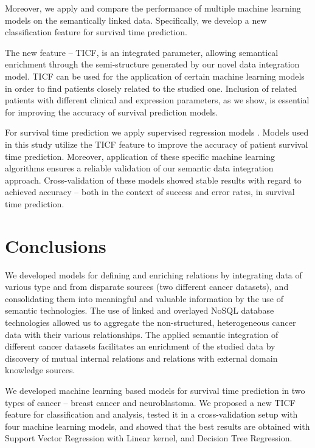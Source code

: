\documentclass{bmcart}
\begin{document}
Moreover, we apply and compare the performance of multiple machine
learning models on the semantically linked data. Specifically, we
develop a new classification feature for survival time prediction. 

The new feature -- TICF, is an integrated parameter, allowing semantical
enrichment through the semi-structure generated by our novel data
integration model. TICF can be used for the application of certain
machine learning models in order to find patients closely related to
the studied one. Inclusion of related patients with different clinical
and expression parameters, as we show, is essential for improving the
accuracy of survival prediction models.

For survival time prediction we apply supervised regression models \cite{19,20}. Models used in this study utilize the TICF feature to improve the
accuracy of patient survival time prediction. Moreover, application of
these specific machine learning algorithms ensures a reliable
validation of our semantic data integration approach. Cross-validation
of these models showed stable results with regard to achieved accuracy
-- both in the context of success and error rates, in survival time
prediction.  

\section{Conclusions}

We developed models for defining and enriching relations by integrating
data of various type and from disparate sources (two different cancer
datasets), and consolidating them into meaningful and valuable
information by the use of semantic technologies. The use of linked and
overlayed NoSQL database technologies allowed us to aggregate the
non-structured, heterogeneous cancer data with their various
relationships. The applied semantic integration of different cancer
datasets facilitates an enrichment of the studied data by discovery of
mutual internal relations and relations with external domain knowledge
sources. 

We developed machine learning based models for survival time prediction
in two types of cancer {}-- breast cancer and neuroblastoma. We
proposed a new TICF feature for classification and analysis, tested it
in a cross-validation setup with four machine learning models, and
showed that the best results are obtained with Support Vector
Regression with Linear kernel, and Decision Tree Regression. 
\end{document}
